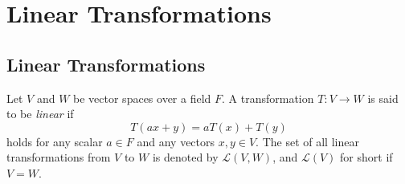 \chapter{Linear Transformations}
\section{Linear Transformations}
\begin{definition}
  \label{def:linear-transformation}
  Let $V$ and $W$ be vector spaces over a field $F$.
  A transformation $T: V \to W$ is said to be \emph{linear} if
  \begin{equation*}
    T(ax + y) = aT(x) + T(y)
  \end{equation*}
  holds for any scalar $a \in F$ and any vectors $x, y \in V$.
  The set of all linear transformations from $V$ to $W$ is denoted by
  $\mathcal{L}(V, W)$, and $\mathcal{L}(V)$ for short if $V = W$.
\end{definition}

